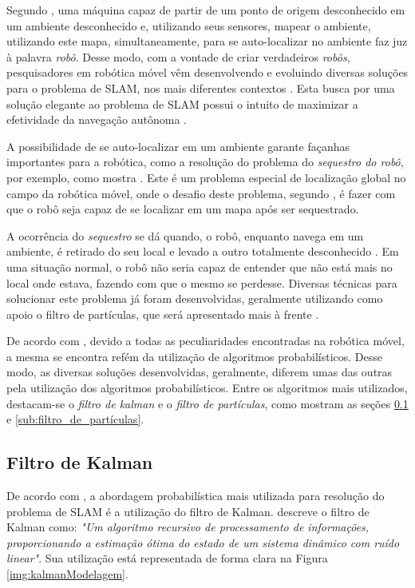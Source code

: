 Segundo \cite{slamProblem}, uma máquina capaz de partir de um ponto de origem desconhecido em um ambiente desconhecido e, utilizando seus sensores, mapear o ambiente, utilizando este mapa, simultaneamente, para se auto-localizar no ambiente faz juz à palavra \textit{robô}. Desse modo, com a vontade de criar verdadeiros \textit{robôs}, pesquisadores em robótica móvel vêm desenvolvendo e evoluindo diversas soluções para o problema de SLAM, nos mais diferentes contextos \cite{integrationVisionSLAMnonlinear}. Esta busca por uma solução elegante ao problema de SLAM possui o intuito de maximizar a efetividade da navegação autônoma \cite{theCleaningProject}. 

A possibilidade de se auto-localizar em um ambiente garante façanhas importantes para a robótica, como a resolução do problema do \textit{sequestro do robô}, por exemplo, como mostra \cite{sequestro}. Este é um problema especial de localização global no campo da robótica móvel, onde o desafio deste problema, segundo \cite{sequestroRobo}, é fazer com que o robô seja capaz de se localizar em um mapa após ser sequestrado.

A ocorrência do \textit{sequestro} se dá quando, o robô, enquanto navega em um ambiente, é retirado do seu local e levado a outro totalmente desconhecido \cite{sequestro}. Em uma situação normal, o robô não seria capaz de entender que não está mais no local onde estava, fazendo com que o mesmo se perdesse. Diversas técnicas para solucionar este problema já foram desenvolvidas, geralmente utilizando como apoio o filtro de partículas, que será apresentado mais à frente \cite{sequestroRobo}. 

De acordo com \cite{circumventingAssociationSLAM}, devido a todas as peculiaridades encontradas na robótica móvel, a mesma se encontra refém da utilização de algoritmos probabilísticos. Desse modo, as diversas soluções desenvolvidas, geralmente, diferem umas das outras pela utilização dos algoritmos probabilísticos. Entre os algoritmos mais utilizados, destacam-se o \textit{filtro de kalman} e o \textit{filtro de partículas}, como mostram as seções \ref{sub:kalman} e \ref{sub:filtro_de_partículas}.

\subsection{Filtro de Kalman} %
\label{sub:kalman}

De acordo com \cite{slamProblem}, a abordagem probabilística mais utilizada para resolução do problema de SLAM é a utilização do filtro de Kalman. \cite{theCleaningProject} descreve o filtro de Kalman como: \textit{"Um algoritmo recursivo de processamento de informações, proporcionando a estimação ótima do estado de um sistema dinâmico com ruído linear"}. Sua utilização está representada de forma clara na Figura \ref{img:kalmanModelagem}.

